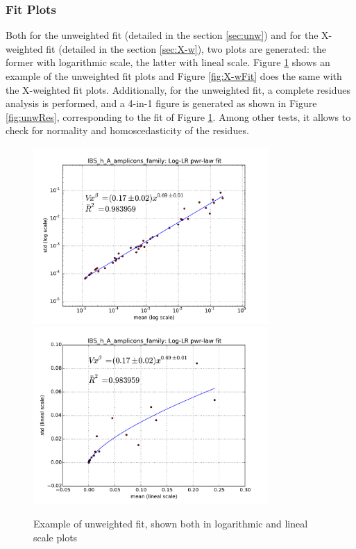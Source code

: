 \subsubsection*{Fit Plots}
Both for the unweighted fit (detailed in the section \ref{sec:unw}) and for the X-weighted fit (detailed in the section \ref{sec:X-w}), two plots are generated: the former with logarithmic scale, the latter with lineal scale. Figure \ref{fig:unwFit} shows an example of the unweighted fit plots and Figure \ref{fig:X-wFit} does the same with the X-weighted fit plots. Additionally, for the unweighted fit, a complete residues analysis is performed, and a 4-in-1 figure is generated as shown in Figure \ref{fig:unwRes}, corresponding to the fit of Figure \ref{fig:unwFit}. Among other tests, it allows to check for normality and homoscedasticity of the residues.

\begin{figure}
	\centering
	\includegraphics[width=0.8\textwidth]{results/fits/IBS_h_A_amplicons_family_stdVSmean_LLR_LOG.pdf}
	\includegraphics[width=0.8\textwidth]{results/fits/IBS_h_A_amplicons_family_stdVSmean_LLR_LIN.pdf}
	\caption{Example of unweighted fit, shown both in logarithmic and lineal scale plots}
	\label{fig:unwFit}
\end{figure}


